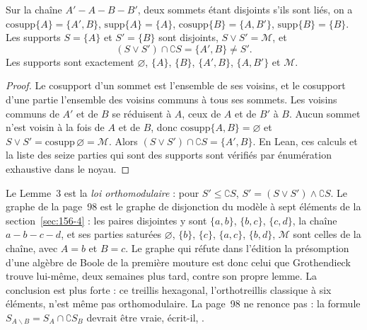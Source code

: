 \begin{encadre}
\begin{contrexemple}
Sur la chaîne $A' - A - B - B'$, deux sommets étant disjoints s'ils sont liés, on a $\mathrm{cosupp}\{A\} = \{A', B\}$, $\mathrm{supp}\{A\} = \{A\}$, $\mathrm{cosupp}\{B\} = \{A, B'\}$, $\mathrm{supp}\{B\} = \{B\}$. Les supports $S = \{A\}$ et $S' = \{B\}$ sont disjoints, $S \vee S' = \mathcal M$, et
\[
(S \vee S') \cap \complement S = \{A', B\} \neq S' .
\]
Les supports sont exactement $\varnothing$, $\{A\}$, $\{B\}$, $\{A', B\}$, $\{A, B'\}$ et $\mathcal M$.
\end{contrexemple}
\end{encadre}

\begin{proof}
Le cosupport d'un sommet est l'ensemble de ses voisins, et le cosupport d'une partie l'ensemble des voisins communs à tous ses sommets. Les voisins communs de $A'$ et de $B$ se réduisent à $A$, ceux de $A$ et de $B'$ à $B$. Aucun sommet n'est voisin à la fois de $A$ et de $B$, donc $\mathrm{cosupp}\{A, B\} = \varnothing$ et $S \vee S' = \mathrm{cosupp}\, \varnothing = \mathcal M$. Alors $(S \vee S') \cap \complement S = \{A', B\}$. En Lean, ces calculs et la liste des seize parties qui sont des supports sont vérifiés par énumération exhaustive dans le noyau.
\end{proof}

\begin{remarque}
Le Lemme~3 est la \emph{loi orthomodulaire} : pour $S' \leq \complement S$, $S' = (S \vee S') \wedge \complement S$. Le graphe de la page~98 est le graphe de disjonction du modèle à sept éléments de la section~\ref{sec:156-4} : les paires disjointes y sont $\{a, b\}$, $\{b, c\}$, $\{c, d\}$, la chaîne $a - b - c - d$, et ses parties saturées $\varnothing$, $\{b\}$, $\{c\}$, $\{a, c\}$, $\{b, d\}$, $\mathcal M$ sont celles de la chaîne, avec $A = b$ et $B = c$. Le graphe qui réfute dans l'édition la présomption d'une algèbre de Boole de la première mouture est donc celui que Grothendieck trouve lui-même, deux semaines plus tard, contre son propre lemme. La conclusion est plus forte : ce treillis hexagonal, l'orthotreillis classique à six éléments, n'est même pas orthomodulaire. La page~98 ne renonce pas : la formule $S_{A \smallsetminus B} = S_A \cap \complement S_B$ devrait être vraie, écrit-il, .
\end{remarque}

